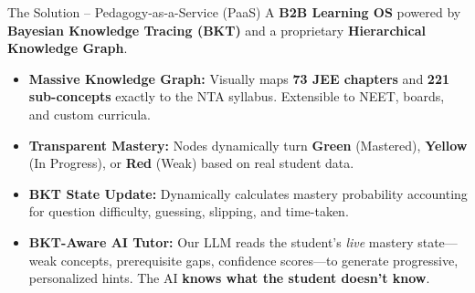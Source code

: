 \documentclass[aspectratio=169, 10pt]{beamer}
\newcommand{\bspace}{\vspace{0.3em}}
\begin{document}
\begin{frame}{The Solution -- Pedagogy-as-a-Service (PaaS)}
  A \textbf{B2B Learning OS} powered by \textbf{Bayesian Knowledge Tracing (BKT)} and a proprietary \textbf{Hierarchical Knowledge Graph}.

  \bspace
  \begin{itemize}
    \setlength\itemsep{0.5em}
    \item \textbf{Massive Knowledge Graph:} Visually maps \textbf{73 JEE chapters} and \textbf{221 sub-concepts} exactly to the NTA syllabus. Extensible to NEET, boards, and custom curricula.

    \item \textbf{Transparent Mastery:} Nodes dynamically turn \textcolor{LearnGreen}{\textbf{Green}} (Mastered), \textcolor{LearnYellow}{\textbf{Yellow}} (In Progress), or \textcolor{LearnRed}{\textbf{Red}} (Weak) based on real student data.

    \item \textbf{BKT State Update:} Dynamically calculates mastery probability accounting for question difficulty, guessing, slipping, and time-taken.

    \item \textbf{BKT-Aware AI Tutor:} Our LLM reads the student's \emph{live} mastery state---weak concepts, prerequisite gaps, confidence scores---to generate progressive, personalized hints. The AI \textbf{knows what the student doesn't know}.
  \end{itemize}
\end{frame}
\end{document}
